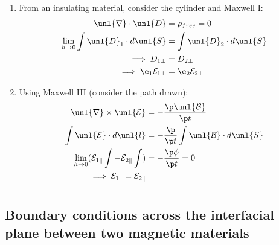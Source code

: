 \documentclass[a4paper, 11pt, normalem]{report}
\renewcommand\E{\mathcal{E}}
\newcommand\uE{\unl{\E}}
\renewcommand\B{\mathcal{B}}
\newcommand\uB{\unl{\B}}
\renewcommand\del{\unl{\nabla}}
\begin{document}
\begin{enumerate}
	\item From an insulating material, consider the cylinder and Maxwell \RN{1}:
	\begin{align}
		\del\cdot\unl{D} &= \rho_{free} = 0 \\
		\lim_{h\to0} \int \unl{D}_1\cdot d\unl{S} &= \int \unl{D}_2\cdot d\unl{S} \\
		\implies D_{1\perp} &= D_{2\perp} \\
		\implies \e_1\E_{1\perp} &= \e_2\E_{2\perp}
	\end{align}
	\item Using Maxwell \RN{3} (consider the path drawn):
	\begin{align}
		\del\times\uE &= -\frac{\p \uB}{\p t} \\
		\int \uE\cdot d\unl{l} &= -\frac{\p}{\p t}\int \uB\cdot d\unl{S} \\
		\lim_{h\to0} (\E_{1\parallel} \int - \E_{2\parallel}\int) &= -\frac{\p\phi}{\p t} = 0 \\
		\implies \E_{1\parallel} = \E_{2\parallel}
	\end{align}
\end{enumerate}


\chapter{}
\section{Boundary conditions across the interfacial plane between two magnetic materials}
\end{document}

